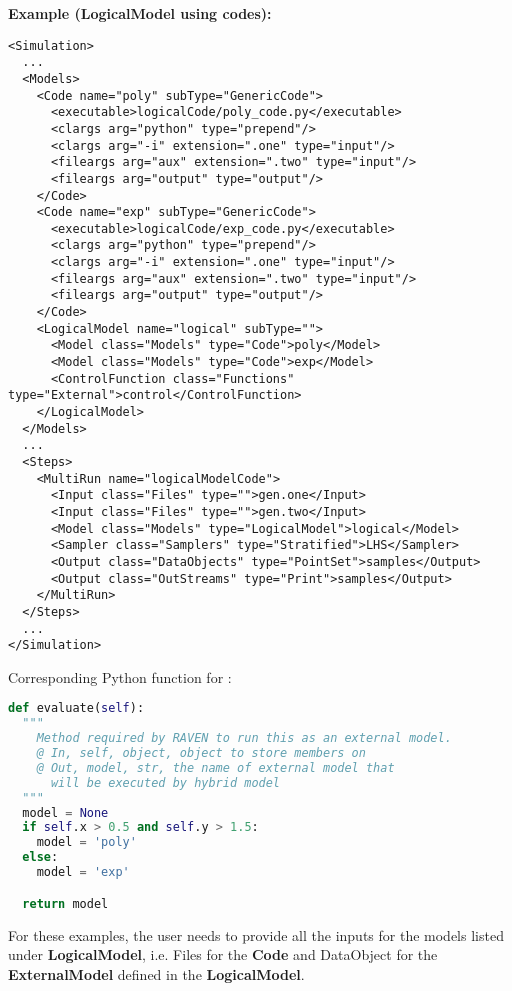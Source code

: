 \textbf{Example (LogicalModel using codes):}
\begin{lstlisting}[style=XML,morekeywords={subType,debug,repeat,name,class,type}]
<Simulation>
  ...
  <Models>
    <Code name="poly" subType="GenericCode">
      <executable>logicalCode/poly_code.py</executable>
      <clargs arg="python" type="prepend"/>
      <clargs arg="-i" extension=".one" type="input"/>
      <fileargs arg="aux" extension=".two" type="input"/>
      <fileargs arg="output" type="output"/>
    </Code>
    <Code name="exp" subType="GenericCode">
      <executable>logicalCode/exp_code.py</executable>
      <clargs arg="python" type="prepend"/>
      <clargs arg="-i" extension=".one" type="input"/>
      <fileargs arg="aux" extension=".two" type="input"/>
      <fileargs arg="output" type="output"/>
    </Code>
    <LogicalModel name="logical" subType="">
      <Model class="Models" type="Code">poly</Model>
      <Model class="Models" type="Code">exp</Model>
      <ControlFunction class="Functions" type="External">control</ControlFunction>
    </LogicalModel>
  </Models>
  ...
  <Steps>
    <MultiRun name="logicalModelCode">
      <Input class="Files" type="">gen.one</Input>
      <Input class="Files" type="">gen.two</Input>
      <Model class="Models" type="LogicalModel">logical</Model>
      <Sampler class="Samplers" type="Stratified">LHS</Sampler>
      <Output class="DataObjects" type="PointSet">samples</Output>
      <Output class="OutStreams" type="Print">samples</Output>
    </MultiRun>
  </Steps>
  ...
</Simulation>
\end{lstlisting}

Corresponding Python function for :
\begin{lstlisting}[language=python]
def evaluate(self):
  """
    Method required by RAVEN to run this as an external model.
    @ In, self, object, object to store members on
    @ Out, model, str, the name of external model that
      will be executed by hybrid model
  """
  model = None
  if self.x > 0.5 and self.y > 1.5:
    model = 'poly'
  else:
    model = 'exp'

  return model
\end{lstlisting}
%
\nb For these examples, the user needs to provide all the inputs for the models listed
under \textbf{LogicalModel}, i.e. Files for the \textbf{Code} and DataObject for
the \textbf{ExternalModel} defined in the \textbf{LogicalModel}.
